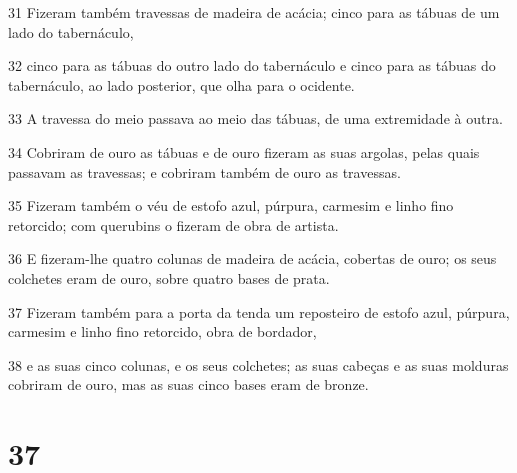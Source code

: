 \par 31 Fizeram também travessas de madeira de acácia; cinco para as tábuas de um lado do tabernáculo,
\par 32 cinco para as tábuas do outro lado do tabernáculo e cinco para as tábuas do tabernáculo, ao lado posterior, que olha para o ocidente.
\par 33 A travessa do meio passava ao meio das tábuas, de uma extremidade à outra.
\par 34 Cobriram de ouro as tábuas e de ouro fizeram as suas argolas, pelas quais passavam as travessas; e cobriram também de ouro as travessas.
\par 35 Fizeram também o véu de estofo azul, púrpura, carmesim e linho fino retorcido; com querubins o fizeram de obra de artista.
\par 36 E fizeram-lhe quatro colunas de madeira de acácia, cobertas de ouro; os seus colchetes eram de ouro, sobre quatro bases de prata.
\par 37 Fizeram também para a porta da tenda um reposteiro de estofo azul, púrpura, carmesim e linho fino retorcido, obra de bordador,
\par 38 e as suas cinco colunas, e os seus colchetes; as suas cabeças e as suas molduras cobriram de ouro, mas as suas cinco bases eram de bronze.

\chapter{37}

